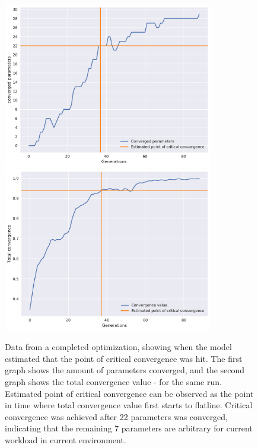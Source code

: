 \documentclass[a4paper,english]{report}
\begin{document}
		\begin{figure}[H]
			\centering
			\includegraphics[width=260pt]{est11}
			\includegraphics[width=260pt]{est12}
			\caption{Data from a completed optimization, showing when the model estimated that the point of critical convergence was hit. The first graph shows the amount of parameters converged, and the second graph shows the total convergence value - for the same run. Estimated point of critical convergence can be observed as the point in time where total convergence value first starts to flatline. Critical convergence was achieved after 22 parameters was converged, indicating that the remaining 7 parameters are arbitrary for current workload in current environment.}
			\label{fig:estimation1}
		\end{figure}
\end{document}

